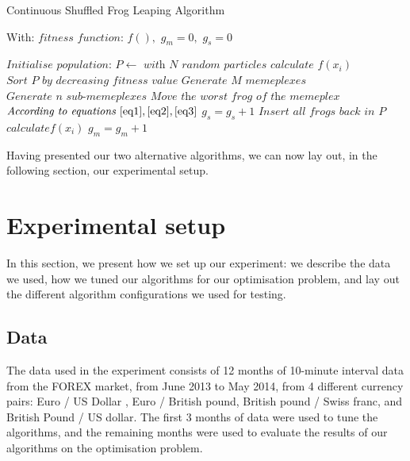 \documentclass[conference]{IEEEtran}
\begin{document}
\begin{algorithm}[htp]
\caption{Continuous Shuffled Frog Leaping Algorithm}\label{csfla_code}
With:
$\textit{fitness function: } f(),$
$g_{m} = 0,$
$g_{s} = 0$
\begin{algorithmic}[1]
\State $\textit{Initialise population: } P \gets \textit{ with } N \textit{ random particles}$
 {$ \textit{calculate }f(x_{i})$}
\EndFor
\State $\textit{Sort } P \textit{ by decreasing fitness value}$
    \State $\textit{Generate } M \textit{ memeplexes}$
        \State $\textit{Generate } n \textit{ sub-memeplexes}$
                \State $\textit{Move the worst frog of the memeplex}$
                \State $\textit{According to equations } \ref{eq1}, \ref{eq2}, \ref{eq3}$
                \State $g_{s} = g_{s} + 1$
            \EndWhile
            \State $\textit{Insert all frogs back in } P$
        \EndFor
    \EndFor
     {$ \textit{calculate}f(x_{i})$}\EndFor
    \State $g_{m} = g_{m} + 1$
\EndWhile
\end{algorithmic}
\end{algorithm}
   

Having presented our two alternative algorithms, we can now lay out, in the following section, our experimental setup. 

\section{Experimental setup}\label{setup}
In this section, we present how we set up our experiment: we describe the data we used, how we tuned our algorithms for our optimisation problem, and lay out the different algorithm configurations we used for testing.

\subsection{Data}
The data used in the experiment consists of 12 months of 10-minute interval data from the FOREX market, from June 2013 to May 2014, from 4 different currency pairs: Euro / US Dollar , Euro / British pound, British pound / Swiss franc, and British Pound / US dollar. The first 3 months of data were used to tune the algorithms, and the remaining months were used  to evaluate the results of our algorithms on the optimisation problem. 
\end{document}
